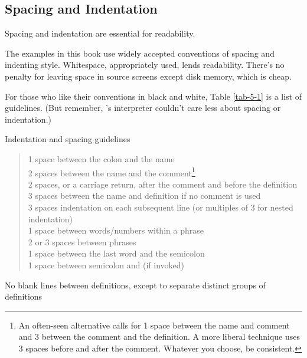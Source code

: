 \subsection{Spacing and Indentation}

\begin{tip}
Spacing and indentation are essential for readability.
\end{tip}
The examples in this book use widely accepted conventions of spacing
and indenting style.  Whitespace, appropriately used, lends
readability.  There's no penalty for leaving space in source screens
except disk memory, which is cheap.

For those who like their conventions in black and white, Table
\ref{tab-5-1} is a list of guidelines.  (But remember, \Forth{}'s
interpreter couldn't care less about spacing or indentation.)

\begin{table}[bbbb]
\caption{Indentation and spacing guidelines}
\label{tab-5-1}
\medskip\blackline{0pt}\medskip
\begin{minipage}{\textwidth}
\begin{quote}
1 space between the colon and the name\\
2 spaces between the name and the comment\footnote{An often-seen
alternative calls for 1 space between the name and comment and 3
between the comment and the definition.  A more liberal technique uses
3 spaces before and after the comment.  Whatever you choose, be
consistent.}\\
2 spaces, or a carriage return, after the comment and
before the definition\footnotemark[1]\\
3 spaces between the name and definition if no comment is used\\
3 spaces indentation on each subsequent line (or multiples
of 3 for nested indentation)\\
1 space between words/numbers within a phrase\\
2 or 3 spaces between phrases\\
1 space between the last word and the semicolon\\
1 space between semicolon and  (if invoked)
\end{quote}
No blank lines between definitions, except to separate distinct groups
of definitions

\end{minipage}
\medskip\blackline{0pt}
\end{table}


